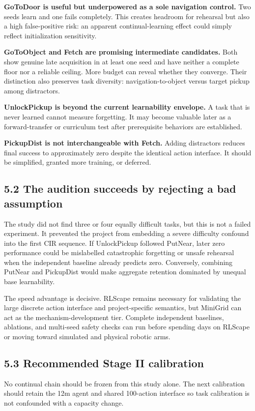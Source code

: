 \documentclass[10pt,a4paper]{article}
\newcommand{\reportsubsection}[1]{\subsection{\textcolor{brandblue}{#1}}}
\begin{document}
\textbf{GoToDoor is useful but underpowered as a sole navigation control.} Two seeds learn and one fails completely. This creates headroom for rehearsal but also a high false-positive risk: an apparent continual-learning effect could simply reflect initialization sensitivity.

\textbf{GoToObject and Fetch are promising intermediate candidates.} Both show genuine late acquisition in at least one seed and have neither a complete floor nor a reliable ceiling. More budget can reveal whether they converge. Their distinction also preserves task diversity: navigation-to-object versus target pickup among distractors.

\textbf{UnlockPickup is beyond the current learnability envelope.} A task that is never learned cannot measure forgetting. It may become valuable later as a forward-transfer or curriculum test after prerequisite behaviors are established.

\textbf{PickupDist is not interchangeable with Fetch.} Adding distractors reduces final success to approximately zero despite the identical action interface. It should be simplified, granted more training, or deferred.

\reportsubsection{5.2 The audition succeeds by rejecting a bad assumption}
The study did not find three or four equally difficult tasks, but this is not a failed experiment. It prevented the project from embedding a severe difficulty confound into the first CIR sequence. If UnlockPickup followed PutNear, later zero performance could be mislabelled catastrophic forgetting or unsafe rehearsal when the independent baseline already predicts zero. Conversely, combining PutNear and PickupDist would make aggregate retention dominated by unequal base learnability.

The speed advantage is decisive. RLScape remains necessary for validating the large discrete action interface and project-specific semantics, but MiniGrid can act as the mechanism-development tier. Complete independent baselines, ablations, and multi-seed safety checks can run before spending days on RLScape or moving toward simulated and physical robotic arms.

\reportsubsection{5.3 Recommended Stage II calibration}
No continual chain should be frozen from this study alone. The next calibration should retain the 12m agent and shared 100-action interface so task calibration is not confounded with a capacity change.
\end{document}
